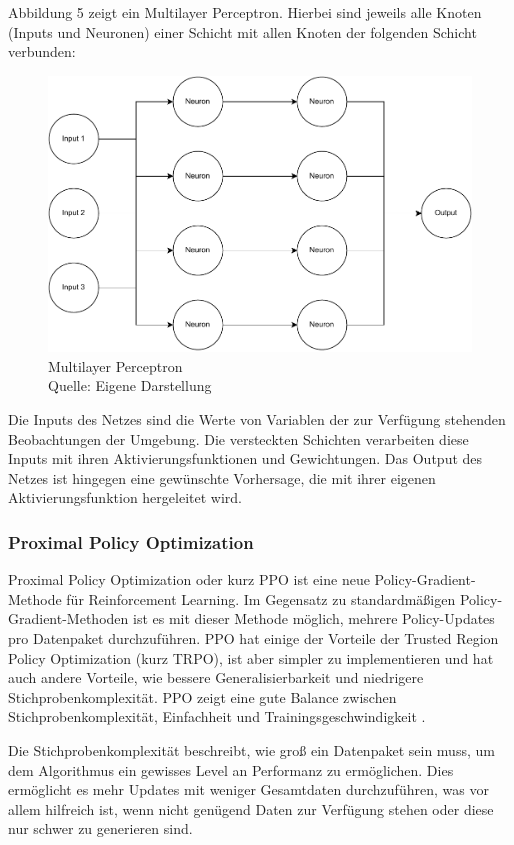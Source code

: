 Abbildung 5 zeigt ein Multilayer Perceptron. Hierbei sind jeweils alle Knoten (Inputs und Neuronen) einer Schicht mit allen Knoten der folgenden Schicht verbunden:
\nopagebreak
\begin{figure}[H]
	\includegraphics[width=1\textwidth]{Bilder/mlp2.drawio} 
	\caption[Multilayer Perceptron]{Multilayer Perceptron\\ Quelle: Eigene Darstellung}
\end{figure}	

Die Inputs des Netzes sind die Werte von Variablen der zur Verfügung stehenden Beobachtungen der Umgebung. Die versteckten Schichten verarbeiten diese Inputs mit ihren Aktivierungsfunktionen und Gewichtungen. Das Output des Netzes ist hingegen eine gewünschte Vorhersage, die mit ihrer eigenen Aktivierungsfunktion hergeleitet wird.
\subsubsection{Proximal Policy Optimization}
Proximal Policy Optimization oder kurz PPO ist eine neue Policy-Gradient-Methode für Reinforcement Learning. Im Gegensatz zu standardmäßigen Policy-Gradient-Methoden ist es mit dieser Methode möglich, mehrere Policy-Updates pro Datenpaket durchzuführen. PPO hat einige der Vorteile der Trusted Region Policy Optimization (kurz TRPO), ist aber simpler zu implementieren und hat auch andere Vorteile, wie bessere Generalisierbarkeit und niedrigere Stichprobenkomplexität. PPO zeigt eine gute Balance zwischen Stichprobenkomplexität, Einfachheit und Trainingsgeschwindigkeit \cite[S. 1]{schulman_proximal_2017}.

Die Stichprobenkomplexität beschreibt, wie groß ein Datenpaket sein muss, um dem Algorithmus ein gewisses Level an Performanz zu ermöglichen. Dies ermöglicht es mehr Updates mit weniger Gesamtdaten durchzuführen, was vor allem hilfreich ist, wenn nicht genügend Daten zur Verfügung stehen oder diese nur schwer zu generieren sind.

